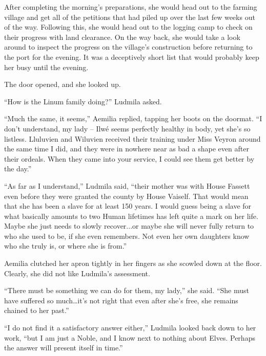  

After completing the morning’s preparations, she would head out to the farming village and get all of the petitions that had piled up over the last few weeks out of the way. Following this, she would head out to the logging camp to check on their progress with land clearance. On the way back, she would take a look around to inspect the progress on the village’s construction before returning to the port for the evening. It was a deceptively short list that would probably keep her busy until the evening.

 

The door opened, and she looked up.

 

“How is the Linum family doing?” Ludmila asked.

 

“Much the same, it seems,” Aemilia replied, tapping her boots on the doormat. “I don’t understand, my lady – Ilwé seems perfectly healthy in body, yet she’s so listless. Lluluvien and Wiluvien received their training under Miss Veyron around the same time I did, and they were in nowhere near as bad a shape even after their ordeals. When they came into your service, I could see them get better by the day.”

 

“As far as I understand,” Ludmila said, “their mother was with House Fassett even before they were granted the county by House Vaiself. That would mean that she has been a slave for at least 150 years. I would guess being a slave for what basically amounts to two Human lifetimes has left quite a mark on her life. Maybe she just needs to slowly recover...or maybe she will never fully return to who she used to be, if she even remembers. Not even her own daughters know who she truly is, or where she is from.”

 

Aemilia clutched her apron tightly in her fingers as she scowled down at the floor. Clearly, she did not like Ludmila’s assessment.

 

“There must be something we can do for them, my lady,” she said. “She must have suffered so much…it’s not right that even after she’s free, she remains chained to her past.”

 

“I do not find it a satisfactory answer either,” Ludmila looked back down to her work, “but I am just a Noble, and I know next to nothing about Elves. Perhaps the answer will present itself in time.”

